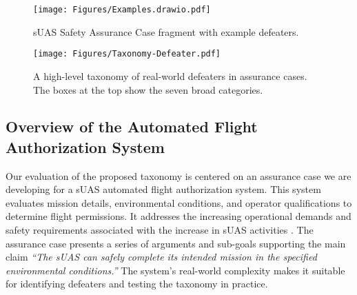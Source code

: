 \begin{figure}
    \centering
    \texttt{[image: Figures/Examples.drawio.pdf]}
    \caption{sUAS Safety Assurance Case fragment with example defeaters.} 
    \label{fig:AC}
    \vspace{-2.5mm}
\end{figure}

\begin{figure*}
    \centering
    \texttt{[image: Figures/Taxonomy-Defeater.pdf]}
    \vspace{-2.5mm}
    \caption{A high-level taxonomy of real-world defeaters in assurance cases. The boxes at the top show the  seven broad  categories.}
    \vspace{-2.5mm}
    \label{fig:taxonomy}
\end{figure*}

\subsection{Overview of the Automated Flight Authorization System}

Our evaluation of the proposed taxonomy is centered on an assurance case \cite{hunter2024family} we are developing for a sUAS automated flight authorization system. This system evaluates mission details, environmental conditions, and operator qualifications to determine flight permissions. It addresses the increasing operational demands and safety requirements associated with the increase in sUAS activities \cite{gohar2024towards}. The assurance case presents a series of arguments and sub-goals supporting the main claim \emph{“The sUAS can safely complete its intended mission in the specified environmental conditions.”} The system's real-world complexity makes it suitable for identifying defeaters and testing the taxonomy in practice.